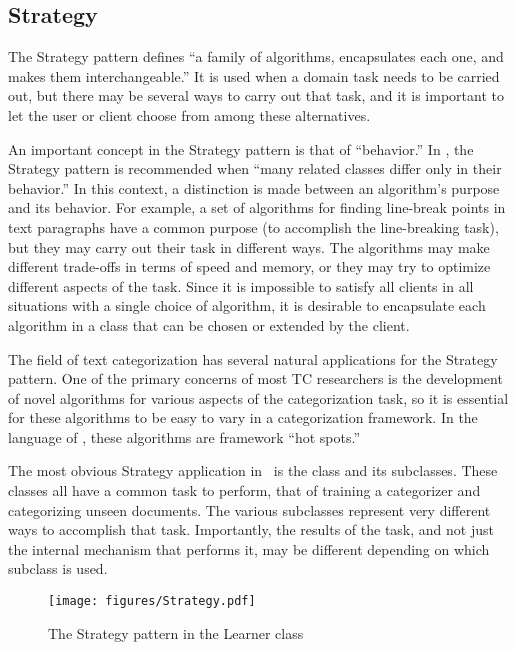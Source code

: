 \subsection{Strategy}
\label{Strategy}

The Strategy pattern defines ``a family of algorithms, encapsulates
each one, and makes them interchangeable.'' \cite[p. 315]{gamma:95}
It is used when a domain task needs to be carried out, but there may
be several ways to carry out that task, and it is important to let the
user or client choose from among these alternatives.

An important concept in the Strategy pattern is that of ``behavior.''
In \cite{gamma:95}, the Strategy pattern is recommended when ``many
related classes differ only in their behavior.''  In this context, a
distinction is made between an algorithm's purpose and its behavior.
For example, a set of algorithms for finding line-break points in text
paragraphs have a common purpose (to accomplish the line-breaking
task), but they may carry out their task in different ways.  The
algorithms may make different trade-offs in terms of speed and memory,
or they may try to optimize different aspects of the task.  Since it
is impossible to satisfy all clients in all situations with a single
choice of algorithm, it is desirable to encapsulate each algorithm in
a class that can be chosen or extended by the client.

The field of text categorization has several natural applications for
the Strategy pattern.  One of the primary concerns of most TC
researchers is the development of novel algorithms for various aspects
of the categorization task, so it is essential for these algorithms to
be easy to vary in a categorization framework.  In the language of
\cite{fayad:99}, these algorithms are framework ``hot spots.''

The most obvious Strategy application in \aicat\ is the
 class and its subclasses.  These classes all have a
common task to perform, that of training a categorizer and
categorizing unseen documents.  The various subclasses represent very
different ways to accomplish that task.  Importantly, the results of
the task, and not just the internal mechanism that performs it, may be
different depending on which  subclass is used.

\begin{figure}
\texttt{[image: figures/Strategy.pdf]}
\caption{The Strategy pattern in the Learner class}
\label{Strategy-learner}
\end{figure}

